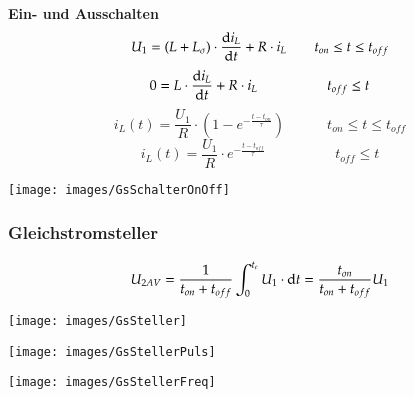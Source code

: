 \begin{minipage}{0.5\linewidth}
\textbf{Ein- und Ausschalten}\newline
\[ U_1=(L + L_{\sigma})\cdot \frac{\mathop{}\!\mathrm{d} i_L}{\mathop{}\!\mathrm{d} t}+R\cdot i_L \qquad t_{on} \leq t \leq t_{off}\]
\[ 0=L\cdot \frac{\mathop{}\!\mathrm{d} i_L}{\mathop{}\!\mathrm{d} t}+ R\cdot i_L \qquad \qquad \quad t_{off}\leq t \]
\[ i_L(t)=\frac{U_1}{R}\cdot(1-e^{-\frac{t-t_{on}}{\tau}}) \qquad \quad t_{on} \leq t \leq t_{off}\]
\[ i_L(t)=\frac{U_1}{R}\cdot e^{-\frac{t-t_{off}}{\tau}} \qquad \quad \qquad t_{off}\leq t \]
\end{minipage}
\begin{minipage}{0.4\linewidth}
    \texttt{[image: images/GsSchalterOnOff]}
\end{minipage}

\subsubsection{Gleichstromsteller}
\begin{minipage}{0.5\linewidth}
\[ U_{2AV}=\frac{1}{t_{on}+t_{off}}\int_{0}^{t_e}U_1\cdot \mathop{}\!\mathrm{d} t = \frac{t_{on}}{t_{on}+t_{off}}U_1 \]
\end{minipage}
\begin{minipage}{0.4\linewidth}
\texttt{[image: images/GsSteller]}
\end{minipage}

\begin{minipage}{0.5\linewidth}
    \texttt{[image: images/GsStellerPuls]}
\end{minipage}
\begin{minipage}{0.5\linewidth}
    \texttt{[image: images/GsStellerFreq]}
\end{minipage}

